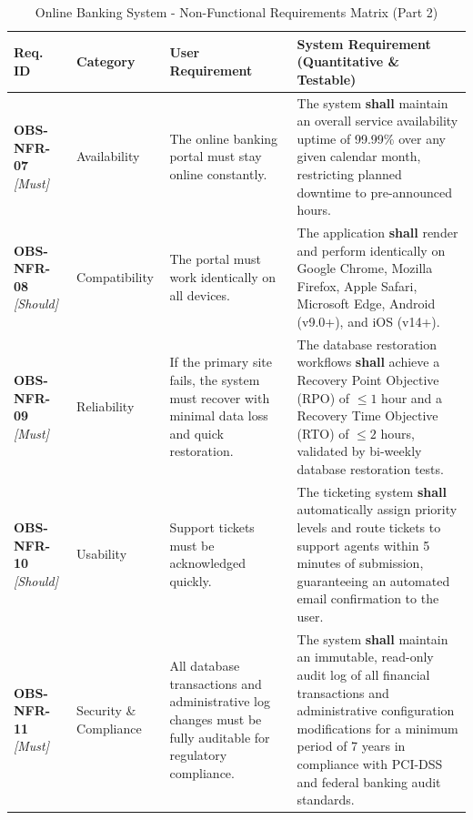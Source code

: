 \documentclass[11pt,a4paper]{article}
\begin{document}
\begin{table}[H]
\centering
\caption{Online Banking System - Non-Functional Requirements Matrix (Part 2)}
\label{tab:nonfunctional_reqs_2}
\footnotesize
\singlespacing
\begin{tabular}{p{2.0cm} p{2.2cm} p{3.8cm} p{5.4cm}}
\toprule
\textbf{Req. ID} & \textbf{Category} & \textbf{User Requirement} & \textbf{System Requirement (Quantitative \& Testable)} \\ \midrule

\textbf{OBS-NFR-07} \newline \textit{\small [Must]} & Availability & The online banking portal must stay online constantly. & The system \textbf{shall} maintain an overall service availability uptime of 99.99\% over any given calendar month, restricting planned downtime to pre-announced hours. \\ \midrule

\textbf{OBS-NFR-08} \newline \textit{\small [Should]} & Compatibility & The portal must work identically on all devices. & The application \textbf{shall} render and perform identically on Google Chrome, Mozilla Firefox, Apple Safari, Microsoft Edge, Android (v9.0+), and iOS (v14+). \\ \midrule

\textbf{OBS-NFR-09} \newline \textit{\small [Must]} & Reliability & If the primary site fails, the system must recover with minimal data loss and quick restoration. & The database restoration workflows \textbf{shall} achieve a Recovery Point Objective (RPO) of $\le 1$ hour and a Recovery Time Objective (RTO) of $\le 2$ hours, validated by bi-weekly database restoration tests. \\ \midrule

\textbf{OBS-NFR-10} \newline \textit{\small [Should]} & Usability & Support tickets must be acknowledged quickly. & The ticketing system \textbf{shall} automatically assign priority levels and route tickets to support agents within 5 minutes of submission, guaranteeing an automated email confirmation to the user. \\ \midrule

\textbf{OBS-NFR-11} \newline \textit{\small [Must]} & Security \& Compliance & All database transactions and administrative log changes must be fully auditable for regulatory compliance. & The system \textbf{shall} maintain an immutable, read-only audit log of all financial transactions and administrative configuration modifications for a minimum period of 7 years in compliance with PCI-DSS and federal banking audit standards. \\ \midrule


\end{tabular}
\end{table}
\end{document}

